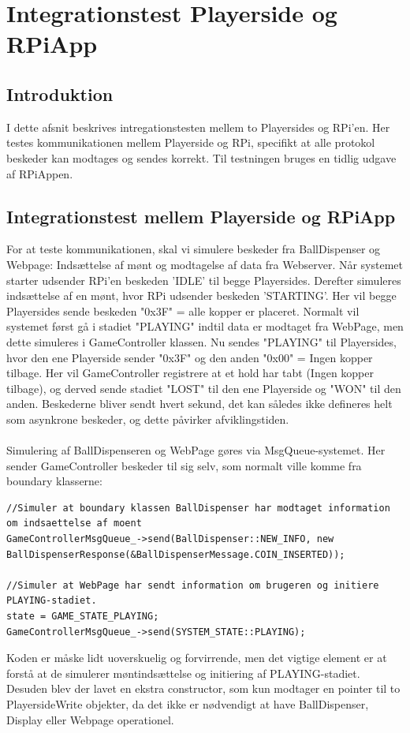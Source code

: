\documentclass[Integrationstest/Integrationstest_main.tex]{subfiles}
\begin{document}
\lstset{style=customc}

\section{Integrationstest Playerside og RPiApp}
\subsection{Introduktion}
I dette afsnit beskrives intregationstesten mellem to Playersides og RPi'en. Her testes kommunikationen mellem Playerside og RPi, specifikt at alle protokol beskeder kan modtages og sendes korrekt. Til testningen bruges en tidlig udgave af RPiAppen. 
\subsection{Integrationstest mellem Playerside og RPiApp}
For at teste kommunikationen, skal vi simulere beskeder fra BallDispenser og Webpage: Indsættelse af mønt og modtagelse af data fra Webserver. Når systemet starter udsender RPi'en beskeden 'IDLE' til begge Playersides. Derefter simuleres indsættelse af en mønt, hvor RPi udsender beskeden 'STARTING'. Her vil begge Playersides sende beskeden "0x3F" = alle kopper er placeret. Normalt vil systemet først gå i stadiet "PLAYING" indtil data er modtaget fra WebPage, men dette simuleres i GameController klassen. Nu sendes "PLAYING" til Playersides, hvor den ene Playerside sender "0x3F" og den anden "0x00" = Ingen kopper tilbage. Her vil GameController registrere at et hold har tabt (Ingen kopper tilbage), og derved sende stadiet "LOST" til den ene Playerside og "WON" til den anden. Beskederne bliver sendt hvert sekund, det kan således ikke defineres helt som asynkrone beskeder, og dette påvirker afviklingstiden.\\\\
Simulering af BallDispenseren og WebPage gøres via MsgQueue-systemet. Her sender GameController beskeder til sig selv, som normalt ville komme fra boundary klasserne: 
\begin{lstlisting}
//Simuler at boundary klassen BallDispenser har modtaget information om indsaettelse af moent
GameControllerMsgQueue_->send(BallDispenser::NEW_INFO, new BallDispenserResponse(&BallDispenserMessage.COIN_INSERTED));

//Simuler at WebPage har sendt information om brugeren og initiere PLAYING-stadiet. 
state = GAME_STATE_PLAYING;
GameControllerMsgQueue_->send(SYSTEM_STATE::PLAYING);
\end{lstlisting}
Koden er måske lidt uoverskuelig og forvirrende, men det vigtige element er at forstå at de simulerer møntindsættelse og initiering af PLAYING-stadiet. Desuden blev der lavet en ekstra constructor, som kun modtager en pointer til to PlayersideWrite objekter, da det ikke er nødvendigt at have BallDispenser, Display eller Webpage operationel. 
\newpage
\end{document}
